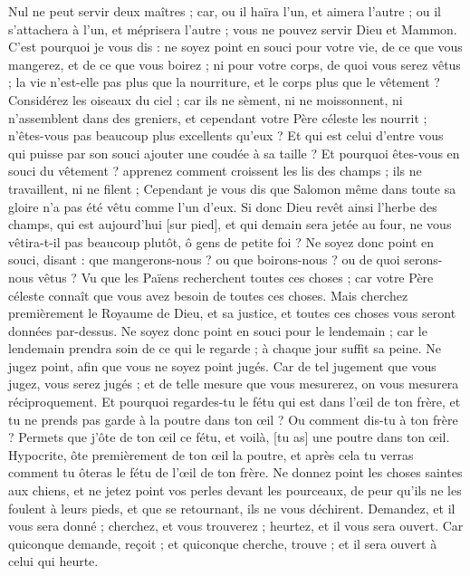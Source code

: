 \begin{multicols}{2}
Nul ne peut servir deux maîtres ; car, ou il haïra l'un, et aimera l'autre ; ou il s'attachera à l'un, et méprisera l'autre ; vous ne pouvez servir Dieu et Mammon.
C'est pourquoi je vous dis : ne soyez point en souci pour votre vie, de ce que vous mangerez, et de ce que vous boirez ; ni pour votre corps, de quoi vous serez vêtus ; la vie n'est-elle pas plus que la nourriture, et le corps plus que le vêtement ?
Considérez les oiseaux du ciel ; car ils ne sèment, ni ne moissonnent, ni n'assemblent dans des greniers, et cependant votre Père céleste les nourrit ; n'êtes-vous pas beaucoup plus excellents qu'eux ?
Et qui est celui d'entre vous qui puisse par son souci ajouter une coudée à sa taille ?
Et pourquoi êtes-vous en souci du vêtement ? apprenez comment croissent les lis des champs ; ils ne travaillent, ni ne filent ;
Cependant je vous dis que Salomon même dans toute sa gloire n'a pas été vêtu comme l'un d'eux.
Si donc Dieu revêt ainsi l'herbe des champs, qui est aujourd'hui [sur pied], et qui demain sera jetée au four, ne vous vêtira-t-il pas beaucoup plutôt, ô gens de petite foi ?
Ne soyez donc point en souci, disant : que mangerons-nous ? ou que boirons-nous ? ou de quoi serons-nous vêtus ?
Vu que les Païens recherchent toutes ces choses ; car votre Père céleste connaît que vous avez besoin de toutes ces choses.
Mais cherchez premièrement le Royaume de Dieu, et sa justice, et toutes ces choses vous seront données par-dessus.
Ne soyez donc point en souci pour le lendemain ; car le lendemain prendra soin de ce qui le regarde ; à chaque jour suffit sa peine.
\VerseOne{}Ne jugez point, afin que vous ne soyez point jugés.
Car de tel jugement que vous jugez, vous serez jugés ; et de telle mesure que vous mesurerez, on vous mesurera réciproquement.
Et pourquoi regardes-tu le fétu qui est dans l'œil de ton frère, et tu ne prends pas garde à la poutre dans ton œil ?
Ou comment dis-tu à ton frère ? Permets que j'ôte de ton œil ce fétu, et voilà, [tu as] une poutre dans ton œil.
Hypocrite, ôte premièrement de ton œil la poutre, et après cela tu verras comment tu ôteras le fétu de l'œil de ton frère.
Ne donnez point les choses saintes aux chiens, et ne jetez point vos perles devant les pourceaux, de peur qu'ils ne les foulent à leurs pieds, et que se retournant, ils ne vous déchirent.
Demandez, et il vous sera donné ; cherchez, et vous trouverez ; heurtez, et il vous sera ouvert.
Car quiconque demande, reçoit ; et quiconque cherche, trouve ; et il sera ouvert à celui qui heurte.

\end{multicols}
